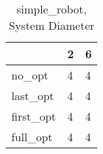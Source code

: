 \begin{table}
\caption{simple\_robot, System Diameter}
\label{simple_robot_diam}
\begin{tabular}{lll}
\toprule
 & 2 & 6 \\
\midrule
no\_opt & 4 & 4 \\
last\_opt & 4 & 4 \\
first\_opt & 4 & 4 \\
full\_opt & 4 & 4 \\
\bottomrule
\end{tabular}
\end{table}

